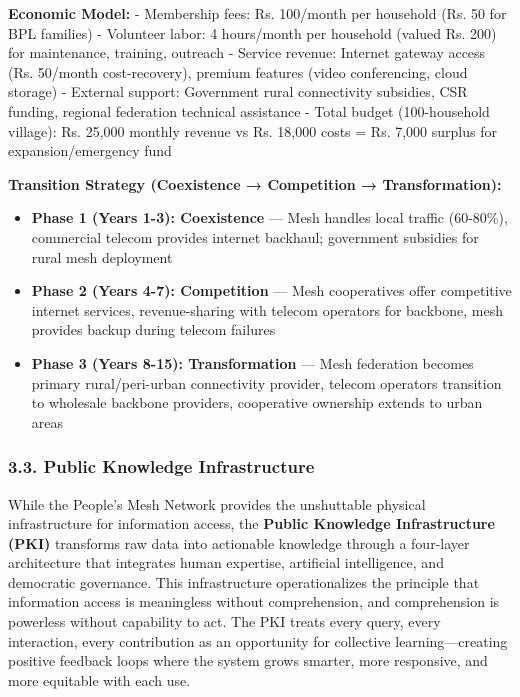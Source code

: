 \textbf{Economic Model:} - Membership fees: Rs. 100/month per household
(Rs. 50 for BPL families) - Volunteer labor: 4 hours/month per household
(valued Rs. 200) for maintenance, training, outreach - Service revenue:
Internet gateway access (Rs. 50/month cost-recovery), premium features
(video conferencing, cloud storage) - External support: Government rural
connectivity subsidies, CSR funding, regional federation technical
assistance - Total budget (100-household village): Rs. 25,000 monthly
revenue vs Rs. 18,000 costs = Rs. 7,000 surplus for expansion/emergency
fund

\textbf{Transition Strategy (Coexistence → Competition →
Transformation):}

\begin{itemize}
\tightlist
\item
  \textbf{Phase 1 (Years 1-3): Coexistence} --- Mesh handles local
  traffic (60-80\%), commercial telecom provides internet backhaul;
  government subsidies for rural mesh deployment
\item
  \textbf{Phase 2 (Years 4-7): Competition} --- Mesh cooperatives offer
  competitive internet services, revenue-sharing with telecom operators
  for backbone, mesh provides backup during telecom failures
\item
  \textbf{Phase 3 (Years 8-15): Transformation} --- Mesh federation
  becomes primary rural/peri-urban connectivity provider, telecom
  operators transition to wholesale backbone providers, cooperative
  ownership extends to urban areas
\end{itemize}

\subsubsection{3.3. Public Knowledge
Infrastructure}\label{public-knowledge-infrastructure}

While the People's Mesh Network provides the unshuttable physical
infrastructure for information access, the \textbf{Public Knowledge
Infrastructure (PKI)} transforms raw data into actionable knowledge
through a four-layer architecture that integrates human expertise,
artificial intelligence, and democratic governance. This infrastructure
operationalizes the principle that information access is meaningless
without comprehension, and comprehension is powerless without capability
to act. The PKI treats every query, every interaction, every
contribution as an opportunity for collective learning---creating
positive feedback loops where the system grows smarter, more responsive,
and more equitable with each use.

